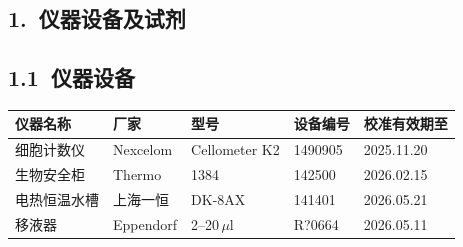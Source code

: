 \documentclass[UTF8,10pt,a4paper,fontset=fandol]{ctexart}
\newcommand{\fieldvalue}[1]{#1}
\newcommand{\handwritten}[1]{#1}
\begin{document}
\begin{center}
\begin{center}
\section*{1.\ 仪器设备及试剂}

\subsection*{1.1\ 仪器设备}

\noindent
\small
\begin{tabularx}{\textwidth}{|p{2.2cm}|p{2.2cm}|p{2.3cm}|p{2.6cm}|X|}
\hline
仪器名称 & 厂家 & 型号 & 设备编号 & 校准有效期至\\
\hline
\fieldvalue{细胞计数仪} &
\fieldvalue{Nexcelom} &
\fieldvalue{Cellometer K2} &
\fieldvalue{\handwritten{1490905}} &
\fieldvalue{\handwritten{2025.11.20}}\\
\hline
\fieldvalue{生物安全柜} &
\fieldvalue{Thermo} &
\fieldvalue{1384} &
\fieldvalue{\handwritten{142500}} &
\fieldvalue{\handwritten{2026.02.15}}\\
\hline
\fieldvalue{电热恒温水槽} &
\fieldvalue{上海一恒} &
\fieldvalue{\handwritten{DK-8AX}} &
\fieldvalue{\handwritten{141401}} &
\fieldvalue{\handwritten{2026.05.21}}\\
\hline
\fieldvalue{移液器} &
\fieldvalue{Eppendorf} &
\fieldvalue{\handwritten{2--20\,\(\mu\)l}} &
\fieldvalue{\handwritten{R?0664}} &
\fieldvalue{\handwritten{2026.05.11}}\\
\hline
\end{tabularx}
\normalsize


\end{center}
\end{center}
\end{document}

